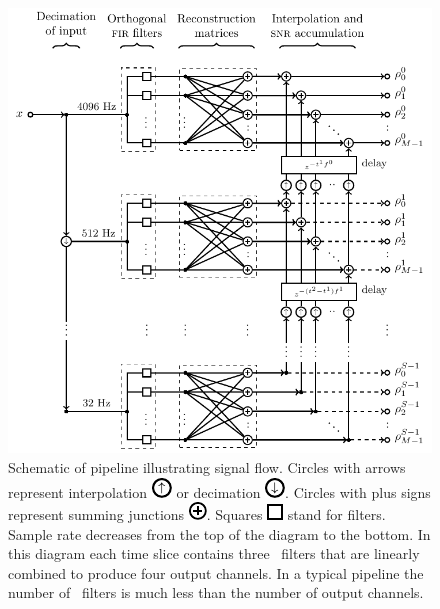 \documentclass[portrait,plainboxedsections]{sciposter}
\begin{document}
\begin{multicols}{3}
\columnbreak

\begin{figure}[h!]
	\begin{center}
		\includegraphics{figures/lloid-diagram}
		\caption{\label{fig:pipeline} Schematic of \lloid{} pipeline illustrating
signal flow.  Circles with arrows represent interpolation
\protect\includegraphics{figures/upsample-symbol} or decimation
\protect\includegraphics{figures/downsample-symbol}.  Circles with plus
signs represent summing junctions
\protect\includegraphics{figures/adder-symbol}.  Squares
\protect\includegraphics{figures/fir-symbol} stand for \fir{} filters.  Sample
rate decreases from the top of the diagram to the bottom.  In this diagram each
time slice contains three \fir\ filters that are linearly combined to produce
four output channels.  In a typical pipeline the number of \fir\ filters is
much less than the number of output channels.}
	\end{center}
\end{figure}


\end{multicols}
\end{document}

